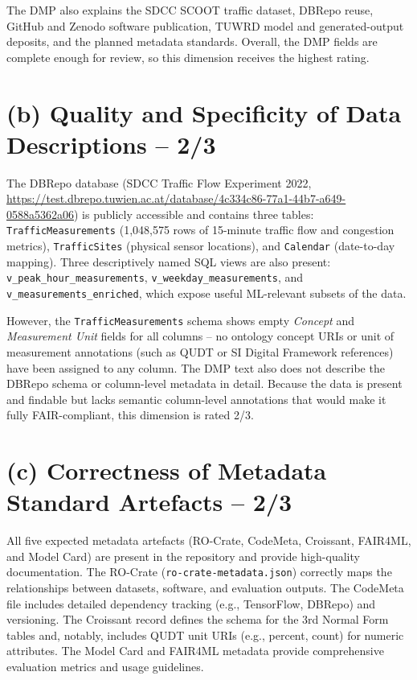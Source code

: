 \documentclass[11pt,a4paper]{article}
\begin{document}
The DMP also explains the SDCC SCOOT traffic dataset, DBRepo reuse, GitHub and Zenodo software publication, TUWRD model and generated-output deposits, and the planned metadata standards. Overall, the DMP fields are complete enough for review, so this dimension receives the highest rating.

\section*{(b) Quality and Specificity of Data Descriptions -- 2/3}

The DBRepo database (SDCC Traffic Flow Experiment 2022, \url{https://test.dbrepo.tuwien.ac.at/database/4c334c86-77a1-44b7-a649-0588a5362a06}) is publicly accessible and contains three tables: \texttt{TrafficMeasurements} (1,048,575 rows of 15-minute traffic flow and congestion metrics), \texttt{TrafficSites} (physical sensor locations), and \texttt{Calendar} (date-to-day mapping). Three descriptively named SQL views are also present: \texttt{v\_peak\_hour\_measurements}, \texttt{v\_weekday\_measurements}, and \texttt{v\_measurements\_enriched}, which expose useful ML-relevant subsets of the data.

However, the \texttt{TrafficMeasurements} schema shows empty \textit{Concept} and \textit{Measurement Unit} fields for all columns -- no ontology concept URIs or unit of measurement annotations (such as QUDT or SI Digital Framework references) have been assigned to any column. The DMP text also does not describe the DBRepo schema or column-level metadata in detail. Because the data is present and findable but lacks semantic column-level annotations that would make it fully FAIR-compliant, this dimension is rated 2/3.

\section*{(c) Correctness of Metadata Standard Artefacts -- 2/3}

All five expected metadata artefacts (RO-Crate, CodeMeta, Croissant, FAIR4ML, and Model Card) are present in the repository and provide high-quality documentation. The RO-Crate (\texttt{ro-crate-metadata.json}) correctly maps the relationships between datasets, software, and evaluation outputs. The CodeMeta file includes detailed dependency tracking (e.g., TensorFlow, DBRepo) and versioning. The Croissant record defines the schema for the 3rd Normal Form tables and, notably, includes QUDT unit URIs (e.g., percent, count) for numeric attributes. The Model Card and FAIR4ML metadata provide comprehensive evaluation metrics and usage guidelines.
\end{document}
